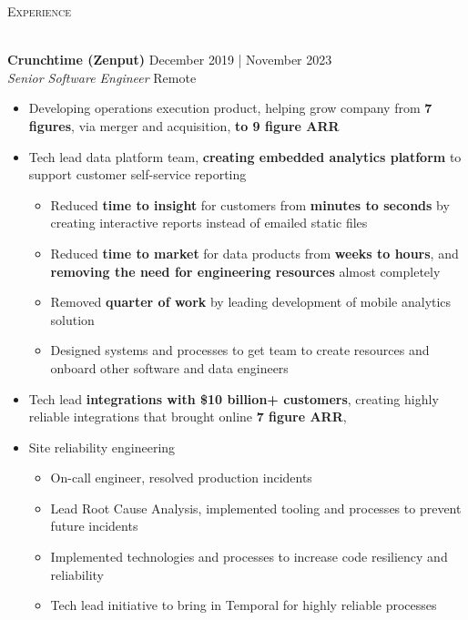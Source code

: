 \documentclass[a4paper]{article}
\newcommand{\lineunder} {
    \vspace*{-8pt} \\
    \hspace*{-18pt} {\color{Mahogany} \hrulefill} \\
}
\newcommand{\header} [1] {
    \vspace{4mm}
    {\hspace*{-18pt}\vspace*{6pt} \large \textsc{\textcolor{Mahogany}{#1}}}
    \vspace*{-6pt} \lineunder
}
\newenvironment{jobdetails}%
    {\list{}{\leftmargin=4mm}\item[]}%
    {\endlist}
\begin{document}
\header{Experience}
\vspace{1mm}

\textbf{Crunchtime (Zenput)} \hfill December 2019 | November 2023 \\
\textit{Senior Software Engineer} \hfill Remote \\
\vspace{2mm}

\begin{jobdetails}
\begin{itemize} \itemsep 1pt
    \item Developing operations execution product, helping grow company from \textbf{7 figures}, via merger and acquisition, \textbf{to 9 figure ARR}
    \item Tech lead data platform team, \textbf{creating embedded analytics platform} to support customer self-service reporting
        \begin{itemize}
            \item Reduced \textbf{time to insight} for customers from \textbf{minutes to seconds} by creating interactive reports instead of emailed static files
            \item Reduced \textbf{time to market} for data products from \textbf{weeks to hours}, and \textbf{removing the need for engineering resources} almost completely
            \item Removed \textbf{quarter of work} by leading development of mobile analytics solution
            \item Designed systems and processes to get team to create resources and onboard other software and data engineers
        \end{itemize}
    \item Tech lead \textbf{integrations with \$10 billion+ customers}, creating highly reliable integrations that brought online \textbf{7 figure ARR},
    \item Site reliability engineering
        \begin{itemize}
            \item On-call engineer, resolved production incidents
            \item Lead Root Cause Analysis, implemented tooling and processes to prevent future incidents
            \item Implemented technologies and processes to increase code resiliency and reliability
            \item Tech lead initiative to bring in Temporal for highly reliable processes

\end{itemize}
\end{itemize}
\end{jobdetails}
\end{document}

